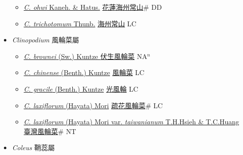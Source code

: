 \begin{itemize}
\begin{itemize}
        \item[] \href{http://www.theplantlist.org/tpl1.1/search?q=Clerodendrum+ohwi}{\textit{C. ohwi} Kaneh. \& Hatus.}   \href{\detokenize{http://taibnet.sinica.edu.tw/chi/taibnet_species_list.php?T2=花蓮海州常山&T2_new_value=true&fr=y}}{花蓮海州常山}\# DD
        \item[] \href{http://www.theplantlist.org/tpl1.1/search?q=Clerodendrum+trichotomum}{\textit{C. trichotomum} Thunb.}   \href{\detokenize{http://taibnet.sinica.edu.tw/chi/taibnet_species_list.php?T2=海州常山&T2_new_value=true&fr=y}}{海州常山} LC
  \end{itemize}
 \item[] \textit{Clinopodium} 風輪菜屬
                    
  \begin{itemize}
        \item[] \href{http://www.theplantlist.org/tpl1.1/search?q=Clinopodium+brownei}{\textit{C. brownei} (Sw.) Kuntze }   \href{\detokenize{http://taibnet.sinica.edu.tw/chi/taibnet_species_list.php?T2=伏生風輪菜&T2_new_value=true&fr=y}}{伏生風輪菜} NA$^n$
        \item[] \href{http://www.theplantlist.org/tpl1.1/search?q=Clinopodium+chinense}{\textit{C. chinense} (Benth.) Kuntze}   \href{\detokenize{http://taibnet.sinica.edu.tw/chi/taibnet_species_list.php?T2=風輪菜&T2_new_value=true&fr=y}}{風輪菜} LC
        \item[] \href{http://www.theplantlist.org/tpl1.1/search?q=Clinopodium+gracile}{\textit{C. gracile} (Benth.) Kuntze}   \href{\detokenize{http://taibnet.sinica.edu.tw/chi/taibnet_species_list.php?T2=光風輪&T2_new_value=true&fr=y}}{光風輪} LC
        \item[] \href{http://www.theplantlist.org/tpl1.1/search?q=Clinopodium+laxiflorum}{\textit{C. laxiflorum} (Hayata) Mori}   \href{\detokenize{http://taibnet.sinica.edu.tw/chi/taibnet_species_list.php?T2=疏花風輪菜&T2_new_value=true&fr=y}}{疏花風輪菜}\# LC
        \item[] \href{http://www.theplantlist.org/tpl1.1/search?q=Clinopodium+laxiflorum+var.+taiwanianum}{\textit{C. laxiflorum} (Hayata) Mori var. \textit{taiwanianum} T.H.Hsieh \& T.C.Huang}   \href{\detokenize{http://taibnet.sinica.edu.tw/chi/taibnet_species_list.php?T2=臺灣風輪菜&T2_new_value=true&fr=y}}{臺灣風輪菜}\# NT
  \end{itemize}
 \item[] \textit{Coleus} 鞘蕊屬
                    

\end{itemize}
